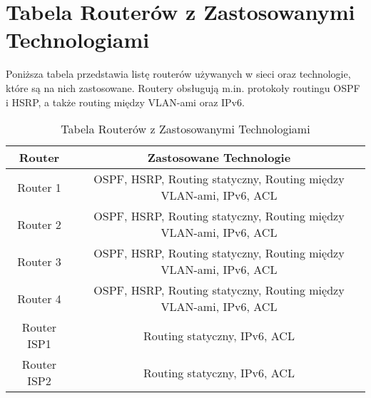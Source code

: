 \section{Tabela Routerów z Zastosowanymi Technologiami}

Poniższa tabela przedstawia listę routerów używanych w sieci oraz technologie, które są na nich zastosowane. Routery obsługują m.in. protokoły routingu OSPF i HSRP, a także routing między VLAN-ami oraz IPv6.

\begin{table}[htbp]
\centering
\caption{Tabela Routerów z Zastosowanymi Technologiami}
\begin{tabular}{|c|c|}
\hline
\textbf{Router} & \textbf{Zastosowane Technologie}             \\ \hline
Router 1        & OSPF, HSRP, Routing statyczny, Routing między VLAN-ami, IPv6, ACL    \\ \hline
Router 2        & OSPF, HSRP, Routing statyczny, Routing między VLAN-ami, IPv6, ACL    \\ \hline
Router 3        & OSPF, HSRP, Routing statyczny, Routing między VLAN-ami, IPv6, ACL    \\ \hline
Router 4        & OSPF, HSRP, Routing statyczny, Routing między VLAN-ami, IPv6, ACL    \\ \hline
Router ISP1     & Routing statyczny, IPv6, ACL     \\ \hline
Router ISP2     & Routing statyczny, IPv6, ACL     \\ \hline
\end{tabular}
\end{table}

